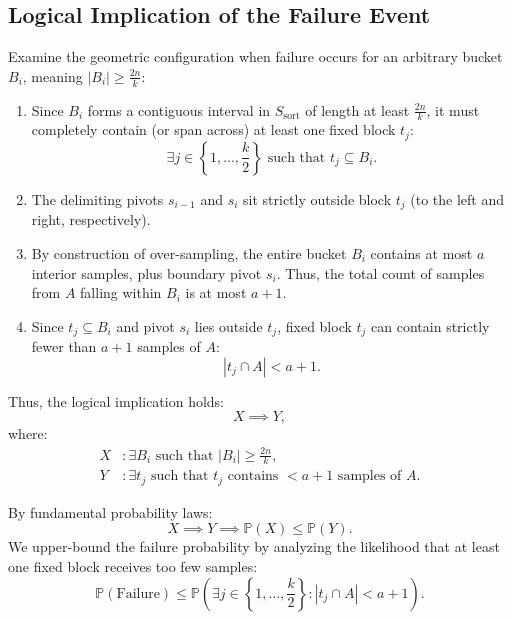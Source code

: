 \subsection{Logical Implication of the Failure Event}
Examine the geometric configuration when failure occurs for an arbitrary bucket $B_i$, meaning $|B_i| \ge \frac{2n}{k}$:
\begin{enumerate}
  \item Since $B_i$ forms a contiguous interval in $S_{\text{sort}}$ of length at least $\frac{2n}{k}$, it must completely contain (or span across) at least one fixed block $t_j$:
  \begin{equation}
    \exists j \in \left\{1, \dots, \frac{k}{2}\right\} \text{ such that } t_j \subseteq B_i.
  \end{equation}
  \item The delimiting pivots $s_{i-1}$ and $s_i$ sit strictly outside block $t_j$ (to the left and right, respectively).
  \item By construction of over-sampling, the entire bucket $B_i$ contains at most $a$ interior samples, plus boundary pivot $s_i$. Thus, the total count of samples from $A$ falling within $B_i$ is at most $a + 1$.
  \item Since $t_j \subseteq B_i$ and pivot $s_i$ lies outside $t_j$, fixed block $t_j$ can contain strictly fewer than $a + 1$ samples of $A$:
  \begin{equation}
    |t_j \cap A| < a + 1.
  \end{equation}
\end{enumerate}

Thus, the logical implication holds:
\begin{equation}
  X \implies Y,
\end{equation}
where:
\begin{align}
  X &\colon \exists B_i \text{ such that } |B_i| \ge \frac{2n}{k}, \\
  Y &\colon \exists t_j \text{ such that } t_j \text{ contains } < a + 1 \text{ samples of } A.
\end{align}

By fundamental probability laws:
\begin{equation}
  X \implies Y \implies \mathbb{P}(X) \le \mathbb{P}(Y).
\end{equation}
We upper-bound the failure probability by analyzing the likelihood that at least one fixed block receives too few samples:
\begin{equation}
  \mathbb{P}(\text{Failure}) \le \mathbb{P}\left(\exists j \in \left\{1, \dots, \frac{k}{2}\right\} \colon |t_j \cap A| < a + 1\right).
\end{equation}

